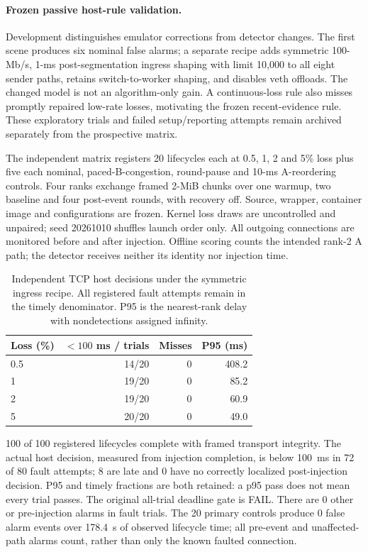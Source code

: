 \documentclass[sigconf]{acmart}
\begin{document}
\paragraph{Frozen passive host-rule validation.}
Development distinguishes emulator corrections from detector changes.
The first scene produces six nominal false alarms; a separate recipe
adds symmetric 100-Mb/s, 1-ms post-segmentation ingress shaping with
limit 10,000 to all eight sender paths, retains switch-to-worker
shaping, and disables veth offloads. The changed model is not an
algorithm-only gain. A continuous-loss rule also misses promptly
repaired low-rate losses, motivating the frozen recent-evidence rule.
These exploratory trials and failed setup/reporting attempts remain
archived separately from the prospective matrix.

The independent matrix registers 20 lifecycles each at 0.5, 1, 2 and
5\% loss plus five each nominal, paced-B-congestion, round-pause and
10-ms A-reordering controls. Four ranks exchange framed 2-MiB chunks
over one warmup, two baseline and four post-event rounds, with recovery
off. Source, wrapper, container image and configurations are frozen.
Kernel loss draws are uncontrolled and unpaired; seed 20261010
shuffles launch order only. All outgoing connections are monitored
before and after injection. Offline scoring counts the intended rank-2
A path; the detector receives neither its identity nor injection time.

\begin{table}[t]
\caption{Independent TCP host decisions under the symmetric ingress recipe.
All registered fault attempts remain in the timely denominator. P95 is the
nearest-rank delay with nondetections assigned infinity.}
\label{tab:tcp-host-validation}
\centering
\small
\begin{tabular}{@{}lrrr@{}}
\toprule
Loss (\%) & $<100$ ms / trials & Misses & P95 (ms) \\
\midrule
0.5 & 14/20 & 0 & 408.2 \\
1 & 19/20 & 0 & 85.2 \\
2 & 19/20 & 0 & 60.9 \\
5 & 20/20 & 0 & 49.0 \\
\bottomrule
\end{tabular}
\end{table}

100 of 100 registered lifecycles complete with framed transport
integrity. The actual host decision, measured from injection completion,
is below 100~ms in 72 of 80 fault attempts; 8 are late and
0 have no correctly localized post-injection decision. P95 and
timely fractions are both retained: a p95 pass does not mean every
trial passes. The original all-trial deadline gate is FAIL.
There are 0 other or pre-injection alarms in fault trials.
The 20 primary controls produce 0 false alarm events over
178.4~s of observed lifecycle time; all pre-event and unaffected-path
alarms count, rather than only the known faulted connection.
\end{document}
